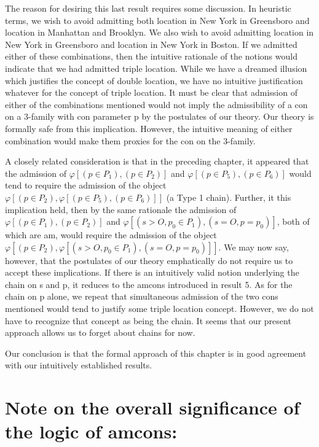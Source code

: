 The reason for desiring this last result requires some discussion. In 
heuristic terms, we wish to avoid admitting both location in New York in 
Greensboro and location in Manhattan and Brooklyn. We also wish to avoid 
admitting location in New York in Greensboro and location in New York in 
Boston. If we admitted either of these combinations, then the intuitive 
rationale of the notions would indicate that we had admitted triple location. 
While we have a dreamed illusion which justifies the concept of double 
location, we have no intuitive justification whatever for the concept of triple 
location. It must be clear that admission of either of the combinations 
mentioned would not imply the admissibility of a con on a 3-family with 
con parameter p by the postulates of our theory. Our theory is formally safe 
from this implication. However, the intuitive meaning of either combination 
would make them proxies for the con on the 3-family. 

A closely related consideration is that in the preceding chapter, it 
appeared that the admission of $\varphi[(p\in P_1),(p\in P_2)]$ and $\varphi[(p\in P_5),(p\in P_6)]$
would tend to require the admission of the object $\varphi[(p\in P_2),\varphi[(p\in P_5),(p\in P_6)]]$
(a Type 1 chain). Further, it this implication held, then by the same 
rationale the admission of $\varphi[(p\in P_1),(p\in P_2)]$ and $\varphi[(s>O,p_0\in P_1),(s=O,p=p_0)]$,
		both of which are am, would require the admission of the object 
$\varphi[(p\in P_2), \varphi[(s>O,p_0\in P_1),(s=O, p=p_0)]]$. 
We may now say, however, 
that the postulates of our theory emphatically do not require us to accept 
these implications. If there is an intuitively valid notion underlying the chain 
on s and p, it reduces to the amcons introduced in result 5. As for the chain 
on p alone, we repeat that simultaneous admission of the two cons 
mentioned would tend to justify some triple location concept. However, we 
do not have to recognize that concept as being the chain. It seems that our 
present approach allows us to forget about chains for now. 

Our conclusion is that the formal approach of this chapter is in good 
agreement with our intuitively established results. 

\section*{Note on the overall significance of the logic of amcons:}

